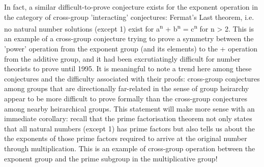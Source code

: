 \documentclass[a4paper,10pt]{article}
\begin{document}
\begin{flushleft}
{{	In fact, a similar difficult-to-prove conjecture exists for the exponent operation in the category of cross-group 'interacting' conjectures: Fermat's Last theorem, i.e. no natural number solutions (except 1) exist for a\textsuperscript{n} + b\textsuperscript{n} = c\textsuperscript{n} for n > 2. This is an example of a cross-group conjecture trying to prove a symmetry between the 'power' operation from the exponent group (and its elements) to the + operation from the additive group, and it had been excrutiatingly difficult for number theorists to prove until 1995. It is meaningful to note a trend here among these conjectures and the difficulty associated with their proofs: {{cross-group conjectures among groups that are directionally far-related in the sense of group heirarchy appear to be more difficult to prove formally than the cross-group conjectures among nearby heirarchical groups.}} This statement will make more sense with an immediate corollary: recall that the prime factorisation theorem not only states that all natural numbers (except 1) has prime factors but also tells us about the the exponents of those prime factors required to arrive at the original number through multiplication. This is an example of cross-group operation between the exponent group and the prime subgroup in the multiplicative group!\linebreak\linebreak\linebreak
	}}
	\textbf{\Large{}}\linebreak\linebreak
		\textls[-50]{\mono{
		-
		}}
\end{flushleft}
\begin{flushright}
	\textbf{\large{}}\linebreak\linebreak
\end{flushright}
\end{document}
